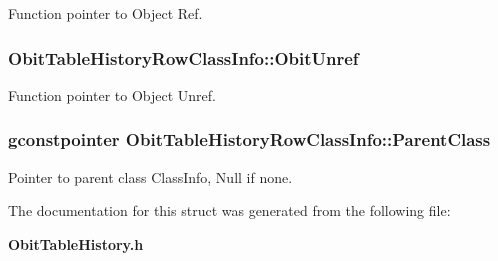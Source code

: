 Function pointer to Object Ref. 

\subsubsection{ {\bf Obit\-Table\-History\-Row\-Class\-Info::Obit\-Unref}}\label{structObitTableHistoryRowClassInfo_o11}


Function pointer to Object Unref. 

\subsubsection{\setlength{\rightskip}{0pt plus 5cm}gconstpointer {\bf Obit\-Table\-History\-Row\-Class\-Info::Parent\-Class}}\label{structObitTableHistoryRowClassInfo_o3}


Pointer to parent class Class\-Info, Null if none. 



The documentation for this struct was generated from the following file:\begin{CompactItemize}
\item 
{\bf Obit\-Table\-History.h}\end{CompactItemize}
